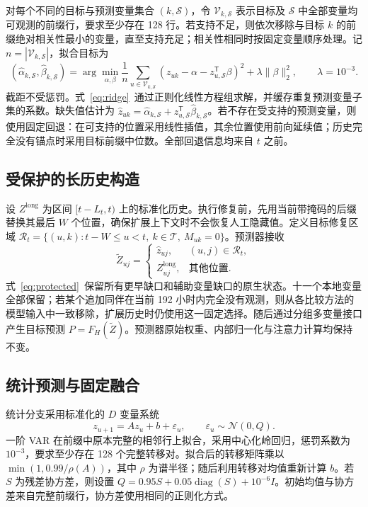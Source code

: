 对每个不同的目标与预测变量集合 $(k,\mathcal S)$，令 $\mathcal V_{k,\mathcal S}$ 表示目标及 $\mathcal S$ 中全部变量均可观测的前缀行，要求至少存在 128 行。若支持不足，则依次移除与目标 $k$ 的前缀绝对相关性最小的变量，直至支持充足；相关性相同时按固定变量顺序处理。记 $n=|\mathcal V_{k,\mathcal S}|$，拟合目标为
\begin{equation}
 (\widehat\alpha_{k,\mathcal S},\widehat\beta_{k,\mathcal S})
 =\arg\min_{\alpha,\beta}\frac1n\sum_{u\in\mathcal V_{k,\mathcal S}}
 (z_{uk}-\alpha-z_{u,\mathcal S}^{\mathsf T}\beta)^2
 +\lambda\|\beta\|_2^2,\qquad \lambda=10^{-3}.
 \label{eq:ridge}
\end{equation}
截距不受惩罚。式~\eqref{eq:ridge}~通过正则化线性方程组求解，并缓存重复预测变量子集的系数。缺失值估计为 $\widehat z_{uk}=\widehat\alpha_{k,\mathcal S}+z_{u,\mathcal S}^{\mathsf T}\widehat\beta_{k,\mathcal S}$。若不存在受支持的预测变量，则使用固定回退：在可支持的位置采用线性插值，其余位置使用前向延续值；历史完全没有锚点时采用目标前缀中位数。全部回退信息均来自 $t$ 之前。

\subsection{受保护的长历史构造}

设 $Z^{\mathrm{long}}$ 为区间 $[t-L_t,t)$ 上的标准化历史。执行修复前，先用当前带掩码的后缀替换其最后 $W$ 个位置，确保扩展上下文时不会恢复人工隐藏值。定义目标修复区域 $\mathcal R_t=\{(u,k):t-W\leq u<t,\ k\in\mathcal T,\ M_{uk}=0\}$。预测器接收
\begin{equation}
 \widetilde Z_{uj}=\begin{cases}
 \widehat z_{uj}, & (u,j)\in\mathcal R_t,\\
 Z^{\mathrm{long}}_{uj}, & \text{其他位置}.
 \end{cases}
 \label{eq:protected}
\end{equation}
式~\eqref{eq:protected}~保留所有更早缺口和辅助变量缺口的原生状态。十一个本地变量全部保留；若某个追加同伴在当前 192 小时内完全没有观测，则从各比较方法的模型输入中一致移除，扩展历史时仍使用这一固定选择。随后通过分组多变量接口产生目标预测 $P=F_H(\widetilde Z)$。预测器原始权重、内部归一化与注意力计算均保持不变。

\subsection{统计预测与固定融合}

统计分支采用标准化的 $D$ 变量系统
\begin{equation}
 z_{u+1}=Az_u+b+\varepsilon_u,\qquad \varepsilon_u\sim\mathcal N(0,Q).
 \label{eq:var}
\end{equation}
一阶 VAR 在前缀中原本完整的相邻行上拟合，采用中心化岭回归，惩罚系数为 $10^{-3}$，要求至少存在 128 个完整转移对。拟合后的转移矩阵乘以 $\min(1,0.99/\rho(A))$，其中 $\rho$ 为谱半径；随后利用转移对均值重新计算 $b$。若 $S$ 为残差协方差，则设置 $Q=0.95S+0.05\operatorname{diag}(S)+10^{-6}I$。初始均值与协方差来自完整前缀行，协方差使用相同的正则化方式。

